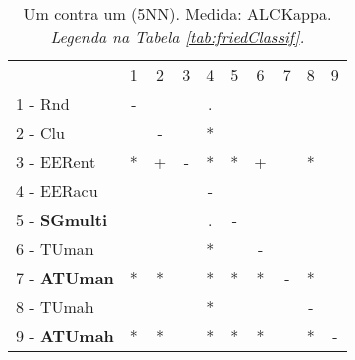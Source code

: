 \begin{table}[h]
\caption{Um contra um (5NN). Medida: ALCKappa. \textit{Legenda na Tabela \ref{tab:friedClassif}.}}
\begin{center}\begin{tabular}{lcc|cc|cc|cc|c}
 			& 1 & 2 & 3 & 4 & 5 & 6 & 7 & 8 & 9\\
1 - Rnd  	& - &   &   & . &   &   &   &   &   \\
2 - Clu  	&   & - &   & * &   &   &   &   &   \\ \hline
3 - EERent	& * & + & - & * & * & + &   & * &   \\
4 - EERacu	&   &   &   & - &   &   &   &   &   \\ \hline
5 - \textbf{SGmulti}	&   &   &   & . & - &   &   &   &   \\
6 - TUman	&   &   &   & * &   & - &   &   &   \\ \hline
7 - \textbf{ATUman}	& * & * &   & * & * & * & - & * &   \\
8 - TUmah	&   &   &   & * &   &   &   & - &   \\ \hline
9 - \textbf{ATUmah}	& * & * &   & * & * & * &   & * & - \\\end{tabular}
\label{stratsALCKappaFried5NNRedux}
\end{center}
\end{table}